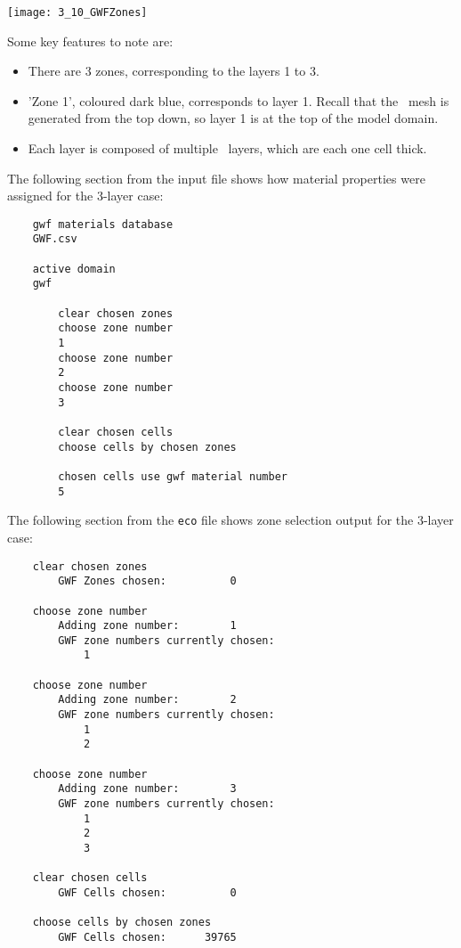 {\texttt{[image: 3\_10\_GWFZones]}

Some key features to note are:
\begin{itemize}
    \item There are 3 zones, corresponding to the layers 1 to 3.
    \item 'Zone 1', coloured dark blue, corresponds to layer 1.  Recall that the \mfus\ mesh is generated from the top down, so layer 1 is at the top of the model domain.
    \item Each layer is composed of multiple \mf\ layers, which are each one cell thick.
\end{itemize}

The following section from the input file shows how material properties were assigned for the 3-layer case:
\begin{verbatim}
    gwf materials database
    GWF.csv

    active domain
    gwf

        clear chosen zones
        choose zone number
        1
        choose zone number
        2
        choose zone number
        3

        clear chosen cells
        choose cells by chosen zones

        chosen cells use gwf material number
        5
\end{verbatim}

The following section from the \texttt{eco} file shows zone selection output for the 3-layer case:
\begin{verbatim}
    clear chosen zones
    	GWF Zones chosen:          0

    choose zone number
    	Adding zone number:        1
    	GWF zone numbers currently chosen:
    	    1

    choose zone number
    	Adding zone number:        2
    	GWF zone numbers currently chosen:
    	    1
    	    2

    choose zone number
    	Adding zone number:        3
    	GWF zone numbers currently chosen:
    	    1
    	    2
    	    3

    clear chosen cells
    	GWF Cells chosen:          0

    choose cells by chosen zones
    	GWF Cells chosen:      39765
\end{verbatim}

}
